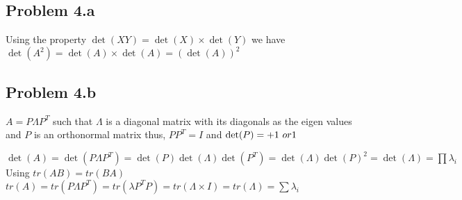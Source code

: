 \documentclass[a4paper]{article}
\begin{document}
\subsection*{Problem 4.a}

Using the property $\det(XY) = \det(X) \times \det(Y)$  we have $\det(A^2) =  \det(A)\times \det(A) = (\det(A))^2$

\subsection{Problem 4.b}

$A = P\Lambda P^T$ such that $\Lambda$ is a diagonal matrix with its diagonals as the eigen values and $P$ is an orthonormal matrix thus, $PP^T=I$ and $\det(P) = +1\ or\-1$ 

$\det(A) = \det(P\Lambda P^T)= \det(P) \det(\Lambda) \det(P^T) = \det(\Lambda) \det(P)^2 = \det(\Lambda) = \prod \lambda_i$ 
Using $tr(AB) = tr(BA)$
$tr(A) = tr(P\Lambda P^T) = tr(\lambda P^T P) = tr(\Lambda \times I) = tr(\Lambda) = \sum \lambda_i$ 
\end{document}
